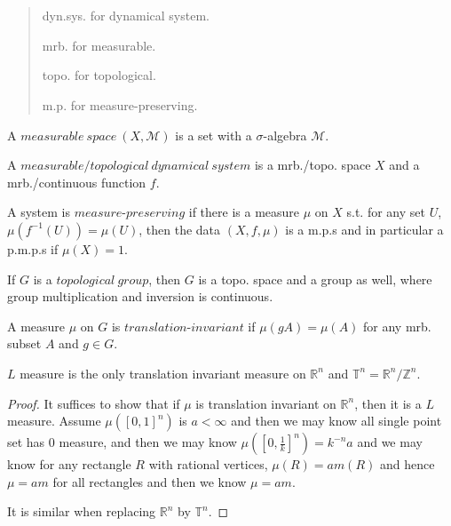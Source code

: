 \documentclass[lang=en, color=blue, ]{elegantbook}
\newcommand{\R}{\mathbb{R}}
\newcommand{\Z}{\mathbb{Z}}
\newcommand{\M}{\mathcal{M}}
\newcommand{\T}{\mathbb{T}}
\begin{document}

\chapter{}
\begin{quotation}
dyn.sys. for dynamical system.\par
mrb. for measurable.\par
topo. for topological.\par
m.p. for measure-preserving.\par
\end{quotation}
\begin{definition}
    A $measurable\ space\ (X,\M)$ is a set with a $\sigma$-algebra $\M$.\par
    A $measurable/topological\ dynamical\ system$ is a mrb./topo. space $X$ and a mrb./continuous function $f$.\par
    A system is $measure$-$preserving$ if there is a measure $\mu$ on $X$ s.t. for any set $U$, $\mu(f^{-1}(U)) = \mu(U)$, then the data $(X,f,\mu)$ is a m.p.s and in particular a p.m.p.s if $\mu(X)=1$.\par
\end{definition}
\begin{definition}
If $G$ is a $topological\ group$, then $G$ is a topo. space and a group as well, where group multiplication and inversion is continuous.\par
A measure $\mu$ on $G$ is $translation$-$invariant$ if $\mu(gA) = \mu(A)$ for any mrb. subset $A$ and $g\in G$.\par
\end{definition}

\begin{proposition}
    $L$ measure is the only translation invariant measure on $\R^n$ and $\T^n = \R^n/\Z^n$.
\end{proposition}
\begin{proof}\par
    It suffices to show that if $\mu$ is translation invariant on $\R^n$, then it is a $L$ measure. Assume $\mu([0,1]^n)$ is $a<\infty$ and then we may know all single point set has $0$ measure, and then we may know $\mu([0,\tfrac{1}{k}]^n) = k^{-n}a$ and we may know for any rectangle $R$ with rational vertices, $\mu(R) = am(R)$ and hence $\mu = am$ for all rectangles and then we know $\mu = am$.\par
    It is similar when replacing $\R^n$ by $\T^n$.\par
\end{proof}
\end{document}
